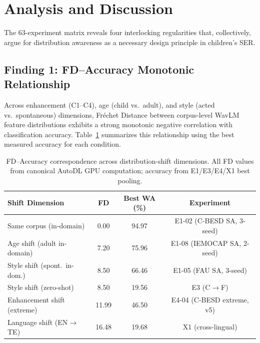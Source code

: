 
\section{Analysis and Discussion}
\label{sec:analysis_discussion}

The 63-experiment matrix reveals four interlocking regularities that,
collectively, argue for distribution awareness as a necessary design principle
in children's SER.

\subsection{Finding 1: FD--Accuracy Monotonic Relationship}

Across enhancement (C1--C4), age (child vs.\ adult), and style (acted vs.\
spontaneous) dimensions, Fr\'{e}chet Distance between corpus-level WavLM
feature distributions exhibits a strong monotonic negative correlation with
classification accuracy. Table~\ref{tab:fd_wa} summarizes this relationship
using the best measured accuracy for each condition.

\begin{table}[h]
\centering
\caption{FD--Accuracy correspondence across distribution-shift dimensions. All FD values from canonical AutoDL GPU computation; accuracy from E1/E3/E4/X1 best pooling.}
\label{tab:fd_wa}
\begin{tabular}{lccc}
\toprule
\textbf{Shift Dimension} & \textbf{FD} & \textbf{Best WA (\%)} & \textbf{Experiment} \\
\midrule
Same corpus (in-domain)       & 0.00  & 94.97 & E1-02 (C-BESD SA, 3-seed) \\
Age shift (adult in-domain)   & 7.20  & 75.96 & E1-08 (IEMOCAP SA, 2-seed) \\
Style shift (spont.\ in-dom.) & 8.50  & 66.46 & E1-05 (FAU SA, 3-seed) \\
Style shift (zero-shot)       & 8.50  & 19.56 & E3 (C$\rightarrow$F) \\
Enhancement shift (extreme)   & 11.99 & 46.50 & E4-04 (C-BESD extreme, v5) \\
Language shift (EN$\rightarrow$TE) & 16.48 & 19.68 & X1 (cross-lingual) \\
\bottomrule
\end{tabular}
\end{table}

